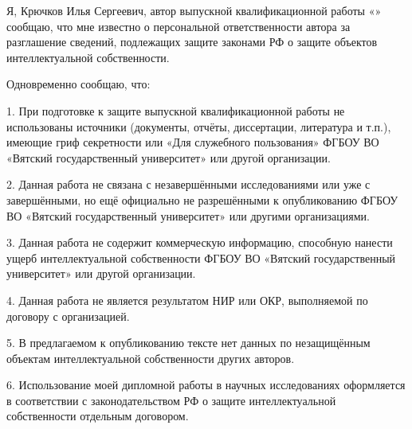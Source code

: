 \begin{singlespace}

	\newcommand{\authorfullname}{Крючков Илья Сергеевич}
	\renewcommand{\authorwithinitials}{Крючков И. С.}
	\renewcommand{\headofdepartment}{М. Л. Долженкова}

	Я, \authorfullname , автор выпускной квалификационной
	работы «\topic» сообщаю, что мне известно о персональной ответственности автора
	за разглашение сведений, подлежащих защите законами РФ о защите объектов
	интеллектуальной собственности.

	Одновременно сообщаю, что:

	1. При подготовке к защите выпускной квалификационной работы не
	использованы источники (документы, отчёты, диссертации, литература и т.п.),
	имеющие гриф секретности или «Для служебного пользования» ФГБОУ ВО
	«Вятский государственный университет» или другой организации.

	2. Данная работа не связана с незавершёнными исследованиями или уже
	с завершёнными, но ещё официально не разрешёнными к опубликованию
	ФГБОУ ВО «Вятский государственный университет» или другими
	организациями.

	3. Данная работа не содержит коммерческую информацию, способную
	нанести ущерб интеллектуальной собственности ФГБОУ ВО «Вятский
	государственный университет» или другой организации.

	4. Данная работа не является результатом НИР или ОКР, выполняемой по
	договору с организацией.

	5. В предлагаемом к опубликованию тексте нет данных по
	незащищённым объектам интеллектуальной собственности других авторов.

	6. Использование моей дипломной работы в научных исследованиях
	оформляется в соответствии с законодательством РФ о защите интеллектуальной
	собственности отдельным договором.

	\newcommand{\daysize}{2em}

	\newcommand{\confirm}{
		\noindent
		Сведения по авторской справке подтверждаю:~«\uline{\hspace{\daysize}}»
	}

	\newcommand{\verticalspacesize}{2em}

	\newcommand{\rightindent}{2em}

	\newcommand{\customtheyear}{\the\year~г.}

	\newcommand{\rightindentwithyear}{\widthof{\customtheyear}+\rightindent}

	\newcommand{\signaturesize}{6.6em}


\end{singlespace}

